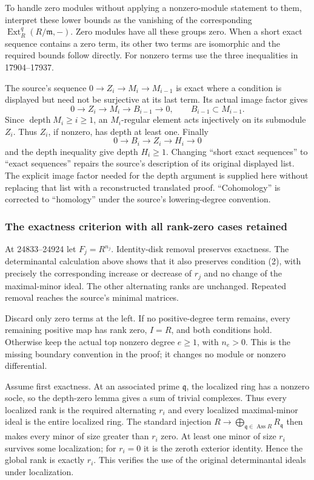 To handle zero modules without applying a nonzero-module statement to them, interpret these lower bounds as the vanishing of the corresponding \(\operatorname{Ext}^q_R(R/\mathfrak m,-)\). Zero modules have all these groups zero. When a short exact sequence contains a zero term, its other two terms are isomorphic and the required bounds follow directly. For nonzero terms use the three inequalities in 17904--17937.

The source's sequence \(0\to Z_i\to M_i\to M_{i-1}\) is exact where a condition is displayed but need not be surjective at its last term. Its actual image factor gives \[
 0\longrightarrow Z_i\longrightarrow M_i\longrightarrow B_{i-1}
 \longrightarrow0,\qquad B_{i-1}\subset M_{i-1}.
\] Since \(\operatorname{depth}M_i\ge i\ge1\), an \(M_i\)-regular element acts injectively on its submodule \(Z_i\). Thus \(Z_i\), if nonzero, has depth at least one. Finally \[
 0\longrightarrow B_i\longrightarrow Z_i\longrightarrow H_i
 \longrightarrow0
\] and the depth inequality give depth \(H_i\ge1\). Changing ``short exact sequences'' to ``exact sequences'' repairs the source's description of its original displayed list. The explicit image factor needed for the depth argument is supplied here without replacing that list with a reconstructed translated proof. ``Cohomology'' is corrected to ``homology'' under the source's lowering-degree convention.

\subsubsection{The exactness criterion with all rank-zero cases retained}\label{the-exactness-criterion-with-all-rank-zero-cases-retained}

At 24833--24924 let \(F_j=R^{n_j}\). Identity-disk removal preserves exactness. The determinantal calculation above shows that it also preserves condition (2), with precisely the corresponding increase or decrease of \(r_j\) and no change of the maximal-minor ideal. The other alternating ranks are unchanged. Repeated removal reaches the source's minimal matrices.

Discard only zero terms at the left. If no positive-degree term remains, every remaining positive map has rank zero, \(I=R\), and both conditions hold. Otherwise keep the actual top nonzero degree \(e\ge1\), with \(n_e>0\). This is the missing boundary convention in the proof; it changes no module or nonzero differential.

Assume first exactness. At an associated prime \(\mathfrak q\), the localized ring has a nonzero socle, so the depth-zero lemma gives a sum of trivial complexes. Thus every localized rank is the required alternating \(r_i\) and every localized maximal-minor ideal is the entire localized ring. The standard injection \(R\to\bigoplus_{\mathfrak q\in\operatorname{Ass}R}R_{\mathfrak q}\) then makes every minor of size greater than \(r_i\) zero. At least one minor of size \(r_i\) survives some localization; for \(r_i=0\) it is the zeroth exterior identity. Hence the global rank is exactly \(r_i\). This verifies the use of the original determinantal ideals under localization.

